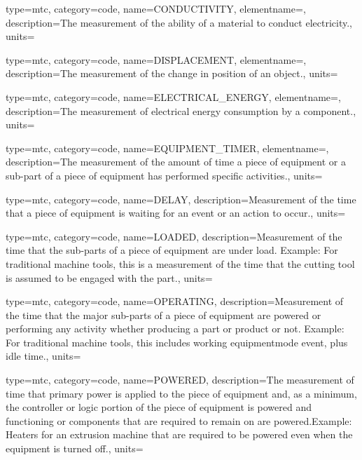 {
  type=mtc,
  category=code,
  name={CONDUCTIVITY},
  elementname=,
  description={The measurement of the ability of a material to conduct electricity.},
  units=
}

{
  type=mtc,
  category=code,
  name={DISPLACEMENT},
  elementname=,
  description={The measurement of the change in position of an object.},
  units=
}

{
  type=mtc,
  category=code,
  name={ELECTRICAL\_ENERGY},
  elementname=,
  description={The measurement of electrical energy consumption by a component.},
  units=
}

{
  type=mtc,
  category=code,
  name={EQUIPMENT\_TIMER},
  elementname=,
  description={The measurement of the amount of time a piece of equipment or a sub-part of a piece of equipment has performed specific activities.},
  units=
}

{
  type=mtc,
  category=code,
  name={DELAY},
  description={Measurement of the time that a piece of equipment is waiting for an event or an action to occur.},
  units=
}

{
  type=mtc,
  category=code,
  name={LOADED},
  description={Measurement of the time that the sub-parts of a piece of equipment are under load. \newline Example: For traditional machine tools, this is a measurement of the time that the cutting tool is assumed to be engaged with the part.},
  units=
}

{
  type=mtc,
  category=code,
  name={OPERATING},
  description={Measurement of the time that the major sub-parts of a piece of equipment are powered or performing any activity whether producing a part or product or not.   \newline Example: For traditional machine tools, this includes \gls{working equipmentmode event}, plus idle time.},
  units=
}

{
  type=mtc,
  category=code,
  name={POWERED},
  description={The measurement of time that primary power is applied to the piece of equipment and, as a minimum, the controller or logic portion of the piece of equipment is powered and functioning or components that are required to remain on are powered.Example: Heaters for an extrusion machine that are required to be powered even when the equipment is turned off.},
  units=
}

